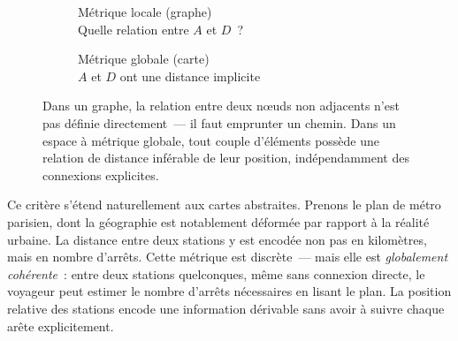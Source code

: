 \begin{figure}[ht]
  \centering
  \usetikzlibrary{calc}
  \begin{subfigure}
    [b]{0.44\textwidth}
    \centering
    \caption{Métrique locale (graphe)\\
    {\footnotesize Quelle relation entre $A$ et $D$~?}}
  \end{subfigure}
  \hfill
  \begin{subfigure}
    [b]{0.44\textwidth}
    \centering
    \caption{Métrique globale (carte)\\
    {\footnotesize $A$ et $D$ ont une distance implicite}}
  \end{subfigure}
  \caption{Dans un graphe, la relation entre deux nœuds non adjacents n'est pas définie
  directement~--- il faut emprunter un chemin. Dans un espace à métrique globale,
  tout couple d'éléments possède une relation de distance inférable de leur position,
  indépendamment des connexions explicites.}
  \label{fig:metrique_locale_globale}
\end{figure}

Ce critère s'étend naturellement aux cartes abstraites. Prenons le plan de métro
parisien, dont la géographie est notablement déformée par rapport à la réalité urbaine.
La distance entre deux stations y est encodée non pas en kilomètres, mais en nombre
d'arrêts. Cette métrique est discrète~--- mais elle est \emph{globalement
cohérente}~: entre deux stations quelconques, même sans connexion directe, le voyageur
peut estimer le nombre d'arrêts nécessaires en lisant le plan. La position
relative des stations encode une information dérivable sans avoir à suivre
chaque arête explicitement.

